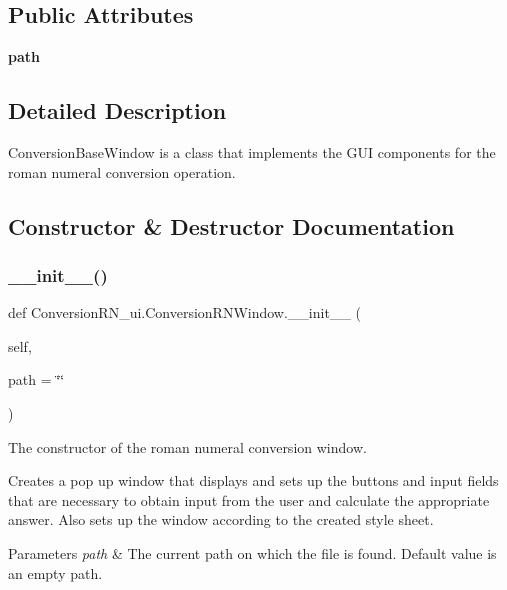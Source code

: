 \subsection*{Public Attributes}
\begin{DoxyCompactItemize}
\item 
\mbox{\label{class_conversion_r_n__ui_1_1_conversion_r_n_window_aa7468d2c903a7f327f268ac030509639}} 
{\bfseries path}
\end{DoxyCompactItemize}


\subsection{Detailed Description}
Conversion\+Base\+Window is a class that implements the G\+UI components for the roman numeral conversion operation. 

\subsection{Constructor \& Destructor Documentation}
\mbox{\label{class_conversion_r_n__ui_1_1_conversion_r_n_window_aa4752dfe8364faa4649c2c19ff55fba6}} 
\subsubsection{\texorpdfstring{\+\_\+\+\_\+init\+\_\+\+\_\+()}{\_\_init\_\_()}}
{\footnotesize\ttfamily def Conversion\+R\+N\+\_\+ui.\+Conversion\+R\+N\+Window.\+\_\+\+\_\+init\+\_\+\+\_\+ (\begin{DoxyParamCaption}\item[{}]{self,  }\item[{}]{path = {\ttfamily \char`\"{}\char`\"{}} }\end{DoxyParamCaption})}



The constructor of the roman numeral conversion window. 

Creates a pop up window that displays and sets up the buttons and input fields that are necessary to obtain input from the user and calculate the appropriate answer. Also sets up the window according to the created style sheet. 
\begin{DoxyParams}{Parameters}
{\em path} & The current path on which the file is found. Default value is an empty path. \\
\hline
\end{DoxyParams}


